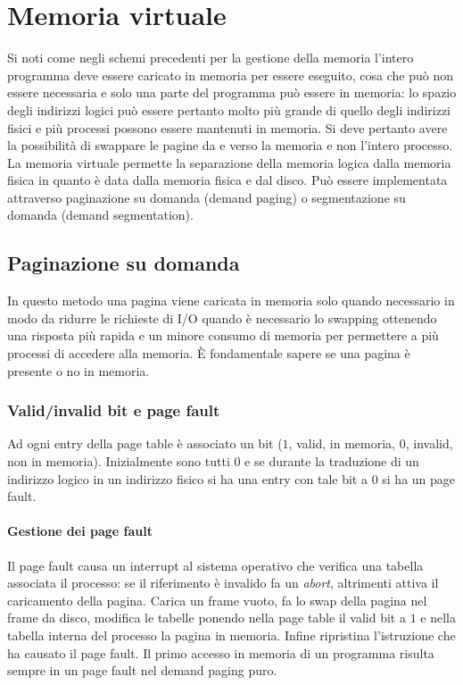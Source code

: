 \chapter{Memoria virtuale}
Si noti come negli schemi precedenti per la gestione della memoria l'intero programma deve essere caricato in memoria per essere eseguito, cosa che pu\`o non essere necessaria
e solo una parte del programma pu\`o essere in memoria: lo spazio degli indirizzi logici pu\`o essere pertanto molto pi\`u grande di quello degli indirizzi fisici e pi\`u processi 
possono essere mantenuti in memoria. Si deve pertanto avere la possibilit\`a di swappare le pagine da e verso la memoria e non l'intero processo. La memoria virtuale permette la
separazione della memoria logica dalla memoria fisica in quanto \`e data dalla memoria fisica e dal disco. Pu\`o essere implementata attraverso paginazione su domanda (demand paging) o
segmentazione su domanda (demand segmentation). 
\section{Paginazione su domanda}
In questo metodo una pagina viene caricata in memoria solo quando necessario in modo da ridurre le richieste di I/O quando \`e necessario lo swapping ottenendo una risposta pi\`u 
rapida e un minore consumo di memoria per permettere a pi\`u processi di accedere alla memoria. \`E fondamentale sapere se una pagina \`e presente o no in memoria. 
\subsection{Valid/invalid bit e page fault}
Ad ogni entry della page table \`e associato un bit ($1$, valid, in memoria, $0$, invalid, non in memoria). Inizialmente sono tutti $0$ e se durante la traduzione di un indirizzo
logico in un indirizzo fisico si ha una entry con tale bit a $0$ si ha un page fault. 
\subsubsection{Gestione dei page fault}
Il page fault causa un interrupt al sistema operativo che verifica una tabella associata il processo: se il riferimento \`e invalido fa un \emph{abort}, altrimenti attiva il caricamento
della pagina. Carica un frame vuoto, fa lo swap della pagina nel frame da disco, modifica le tabelle ponendo nella page table il valid bit a $1$ e nella tabella interna del 
processo la pagina in memoria. Infine ripristina l'istruzione che ha causato il page fault. Il primo accesso in memoria di un programma risulta sempre in un page fault nel demand 
paging puro. 
